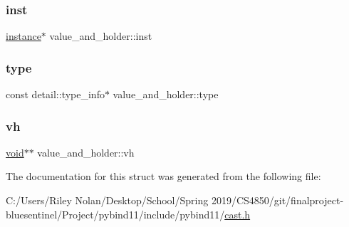 \mbox{\label{structvalue__and__holder_ae92c90379fcf439b23fa77f1d7d84253}} 
\subsubsection{\texorpdfstring{inst}{inst}}
{\footnotesize\ttfamily \mbox{\hyperlink{structinstance}{instance}}$\ast$ value\+\_\+and\+\_\+holder\+::inst}

\mbox{\label{structvalue__and__holder_a55c426843c6e3e164a600d55e4e70f67}} 
\subsubsection{\texorpdfstring{type}{type}}
{\footnotesize\ttfamily const detail\+::type\+\_\+info$\ast$ value\+\_\+and\+\_\+holder\+::type}

\mbox{\label{structvalue__and__holder_a639783d7ffcce71865069b1537e1c1a8}} 
\subsubsection{\texorpdfstring{vh}{vh}}
{\footnotesize\ttfamily \mbox{\hyperlink{_s_d_l__opengles2__gl2ext_8h_ae5d8fa23ad07c48bb609509eae494c95}{void}}$\ast$$\ast$ value\+\_\+and\+\_\+holder\+::vh}



The documentation for this struct was generated from the following file\+:\begin{DoxyCompactItemize}
\item 
C\+:/\+Users/\+Riley Nolan/\+Desktop/\+School/\+Spring 2019/\+C\+S4850/git/finalproject-\/bluesentinel/\+Project/pybind11/include/pybind11/\mbox{\hyperlink{cast_8h}{cast.\+h}}\end{DoxyCompactItemize}
